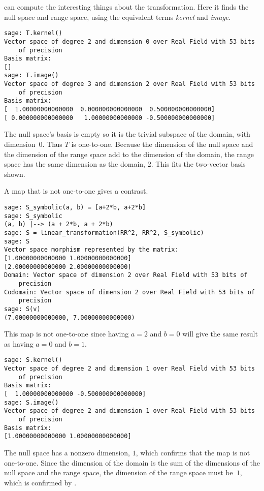 \Sage{} can compute the interesting things about the transformation.
Here it finds the null space 
and range space, using the equivalent 
terms \textit{kernel} and \textit{image}.
\begin{lstlisting}
sage: T.kernel()                                       
Vector space of degree 2 and dimension 0 over Real Field with 53 bits 
    of precision
Basis matrix:
[]
sage: T.image()                                        
Vector space of degree 3 and dimension 2 over Real Field with 53 bits 
    of precision
Basis matrix:
[  1.00000000000000  0.000000000000000  0.500000000000000]
[ 0.000000000000000   1.00000000000000 -0.500000000000000]
\end{lstlisting}
The null space's basis is empty so it is the trivial subspace of the domain,
with dimension~$0$.
Thus $T$ is one-to-one.
Because the dimension of the null space and the dimension of the 
range space add to the dimension of the domain,
the range space has the same dimension as the domain, $2$.
This fits the two-vector basis shown.

A map that is not one-to-one gives a contrast.
\begin{lstlisting}
sage: S_symbolic(a, b) = [a+2*b, a+2*b]
sage: S_symbolic
(a, b) |--> (a + 2*b, a + 2*b)
sage: S = linear_transformation(RR^2, RR^2, S_symbolic)
sage: S
Vector space morphism represented by the matrix:
[1.00000000000000 1.00000000000000]
[2.00000000000000 2.00000000000000]
Domain: Vector space of dimension 2 over Real Field with 53 bits of 
    precision
Codomain: Vector space of dimension 2 over Real Field with 53 bits of 
    precision
sage: S(v)
(7.00000000000000, 7.00000000000000)
\end{lstlisting}
This map is not one-to-one since having $a=2$ and $b=0$ will give
the same result as having $a=0$ and $b=1$.  
\begin{lstlisting}
sage: S.kernel()
Vector space of degree 2 and dimension 1 over Real Field with 53 bits 
    of precision
Basis matrix:
[  1.00000000000000 -0.500000000000000]
sage: S.image()
Vector space of degree 2 and dimension 1 over Real Field with 53 bits 
    of precision
Basis matrix:
[1.00000000000000 1.00000000000000]  
\end{lstlisting}
The null space has a nonzero dimension, $1$, which confirms that the map is not
one-to-one.
Since the dimension of the domain is the sum of the dimensions of the null
space and the range space, the dimension of the range space must be~$1$, 
which is confirmed by \Sage{}.


